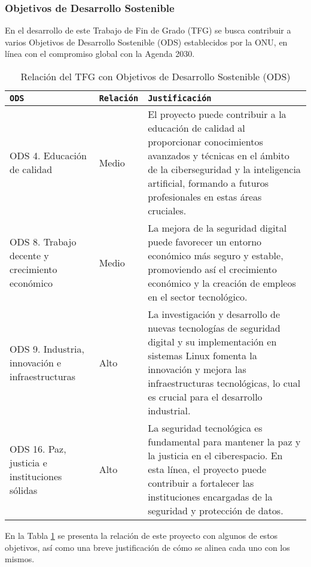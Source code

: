 \subsubsection*{Objetivos de Desarrollo Sostenible}

En el desarrollo de este Trabajo de Fin de Grado (TFG) se busca contribuir a varios Objetivos de Desarrollo Sostenible (\gls{ODS}) establecidos por la \gls{ONU}, en línea con el compromiso global con la Agenda 2030. 

\begin{table}[H]
\scriptsize
\begin{tabularx}{\textwidth}{|p{}|p{}|p{}|}
\hline
\rowcolor{graylight}\texttt{ODS} & \texttt{Relación} & \texttt{Justificación} \\ \hline
ODS 4.  
Educación de calidad & Medio & El proyecto puede contribuir a la educación de calidad al proporcionar conocimientos avanzados y técnicas en el ámbito de la ciberseguridad y la inteligencia artificial, formando a futuros profesionales en estas áreas cruciales. \\ \hline
ODS 8. 
Trabajo decente y crecimiento económico & Medio & La mejora de la seguridad digital puede favorecer un entorno económico más seguro y estable, promoviendo así el crecimiento económico y la creación de empleos en el sector tecnológico. \\ \hline
ODS 9. 
Industria, innovación e infraestructuras & Alto & La investigación y desarrollo de nuevas tecnologías de seguridad digital y su implementación en sistemas Linux fomenta la innovación y mejora las infraestructuras tecnológicas, lo cual es crucial para el desarrollo industrial. \\ \hline
ODS 16. 
Paz, justicia e instituciones sólidas & Alto & La seguridad tecnológica es fundamental para mantener la paz y la justicia en el ciberespacio. En esta línea, el proyecto puede contribuir a fortalecer las instituciones encargadas de la seguridad y protección de datos. \\ \hline
\end{tabularx}
\caption{Relación del TFG con Objetivos de Desarrollo Sostenible (\gls{ODS})}
\label{tab:ods-relacion}
\end{table}

En la Tabla \ref{tab:ods-relacion} se presenta la relación de este proyecto con algunos de estos objetivos, así como una breve justificación de cómo se alinea cada uno con los mismos. \\

